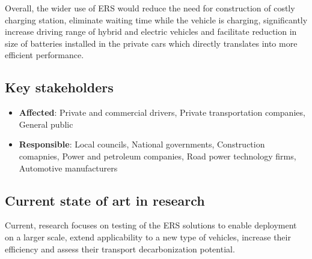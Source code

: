 \documentclass[
]{book}
\providecommand{\tightlist}{%
  \setlength{\itemsep}{0pt}\setlength{\parskip}{0pt}}
\begin{document}
Overall, the wider use of ERS would reduce the need for construction of costly charging station, eliminate waiting time while the vehicle is charging, significantly increase driving range of hybrid and electric vehicles and facilitate reduction in size of batteries installed in the private cars which directly translates into more efficient performance.

\hypertarget{key-stakeholders-1}{%
\subsection*{Key stakeholders}\label{key-stakeholders-1}}

\begin{itemize}
\tightlist
\item
  \textbf{Affected}: Private and commercial drivers, Private transportation companies, General public
\item
  \textbf{Responsible}: Local councils, National governments, Construction comapnies, Power and petroleum companies, Road power technology firms, Automotive manufacturers
\end{itemize}

\hypertarget{current-state-of-art-in-research-1}{%
\subsection*{Current state of art in research}\label{current-state-of-art-in-research-1}}

Current, research focuses on testing of the ERS solutions to enable deployment on a larger scale, extend applicability to a new type of vehicles, increase their efficiency and assess their transport decarbonization potential.
\end{document}

